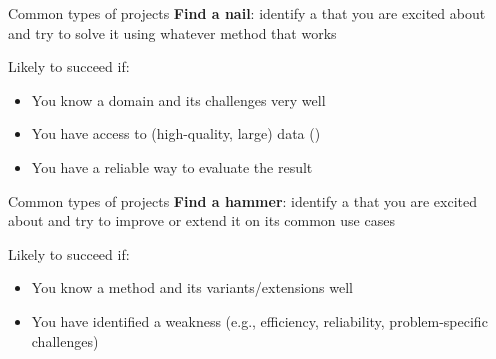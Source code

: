 \documentclass[usenames,dvipsnames,notes,11pt,aspectratio=169,hyperref={colorlinks=true, linkcolor=blue}]{beamer}
\begin{document}
\begin{frame}
    {Common types of projects}
    \textbf{Find a nail}: identify a  that you are excited about and try to solve it using whatever method that works


    Likely to succeed if:\\
    \begin{itemize}
        \item You know a domain and its challenges very well
        \item You have access to (high-quality, large) data ()
        \item You have a reliable way to evaluate the result
    \end{itemize}
\end{frame}

\begin{frame}
    {Common types of projects}
    \textbf{Find a hammer}: identify a  that you are excited about and try to improve or extend it on its common use cases 


    Likely to succeed if:\\
    \begin{itemize}
        \item You know a method and its variants/extensions well 
        \item You have identified a weakness (e.g., efficiency, reliability, problem-specific challenges) 
    \end{itemize}
\end{frame}
\end{document}
